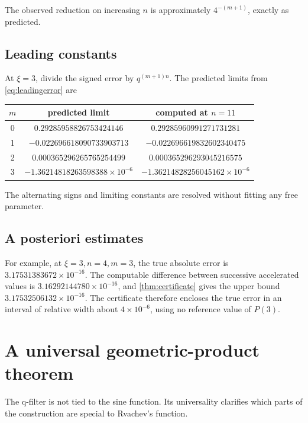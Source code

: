 \documentclass[11pt]{article}
\theoremstyle{definition}
\theoremstyle{remark}
\begin{document}
The observed reduction on increasing \(n\) is approximately
\(4^{-(m+1)}\), exactly as predicted.

\subsection{Leading constants}

At \(\xi=3\), divide the signed error by \(q^{(m+1)n}\). The predicted limits
from \eqref{eq:leadingerror} are
\begin{center}
\begin{tabular}{ccc}
\toprule
\(m\)&predicted limit&computed at \(n=11\)\\
\midrule
0 & \(0.29285958826753424146\) & \(0.29285960991271731281\)\\
1 & \(-0.022696618090733903713\) & \(-0.022696619832602340475\)\\
2 & \(0.000365296265765254499\) & \(0.000365296293045216575\)\\
3 & \(-1.36214818263598388\times10^{-6}\) & \(-1.36214828256045162\times10^{-6}\)\\
\bottomrule
\end{tabular}
\end{center}
The alternating signs and limiting constants are resolved without fitting any
free parameter.

\subsection{A posteriori estimates}

For example, at \(\xi=3,n=4,m=3\), the true absolute error is
\(3.17531383672\times10^{-16}\). The computable difference between successive
accelerated values is \(3.16292144780\times10^{-16}\), and
\cref{thm:certificate} gives the upper bound
\(3.17532506132\times10^{-16}\). The certificate therefore encloses the true
error in an interval of relative width about \(4\times10^{-6}\), using no
reference value of \(P(3)\).

\section{A universal geometric-product theorem}
\label{sec:universal}

The q-filter is not tied to the sine function. Its universality clarifies which
parts of the construction are special to Rvachev's function.
\end{document}
